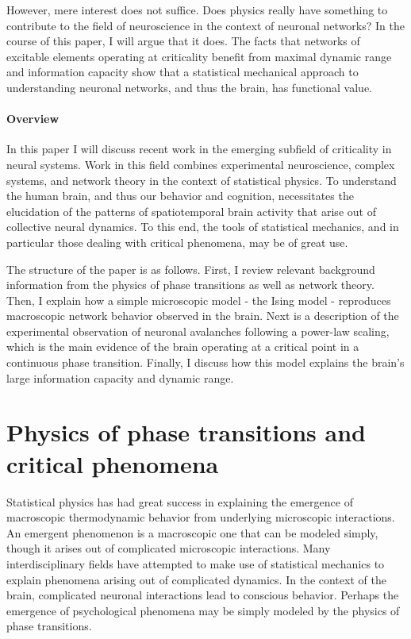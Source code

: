 \documentclass[12pt]{article}
\begin{document}
However, mere interest does not suffice. Does physics really have something to contribute to the field of neuroscience in the context of neuronal networks? In the course of this paper, I will argue that it does. The facts that networks of excitable elements operating at criticality benefit from maximal dynamic range \cite{Kinouchi2006b,Shew2009b} and information capacity\cite{Shew2011a} show that a statistical mechanical approach to understanding neuronal networks, and thus the brain, has functional value.

\paragraph*{Overview} In this paper I will discuss recent work in the emerging subfield of criticality in neural systems. Work in this field combines experimental neuroscience, complex systems, and network theory in the context of statistical physics. To understand the human brain, and thus our behavior and cognition, necessitates the elucidation of the patterns of spatiotemporal brain activity that arise out of collective neural dynamics. To this end, the tools of statistical mechanics, and in particular those dealing with critical phenomena, may be of great use.

The structure of the paper is as follows. First, I review relevant background information from the physics of phase transitions as well as network theory. Then, I explain how a simple microscopic model - the Ising model - reproduces macroscopic network behavior observed in the brain. Next is a description of the experimental observation of neuronal avalanches following a power-law scaling, which is the main evidence of the brain operating at a critical point in a continuous phase transition. Finally, I discuss how this model explains the brain's large information capacity and dynamic range.

\section*{Physics of phase transitions and critical phenomena}

Statistical physics has had great success in explaining the emergence of macroscopic thermodynamic behavior from underlying microscopic interactions. An emergent phenomenon is a macroscopic one that can be modeled simply, though it arises out of complicated microscopic interactions. Many interdisciplinary fields have attempted to make use of statistical mechanics to explain phenomena arising out of complicated dynamics. In the context of the brain, complicated neuronal interactions lead to conscious behavior. Perhaps the emergence of psychological phenomena may be simply modeled by the physics of phase transitions.
\end{document}
